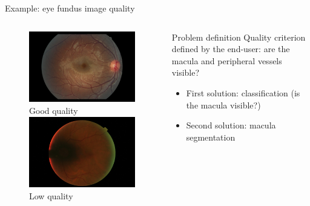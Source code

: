 \documentclass[xcolor=pdftex,dvipsnames,table,mathserif]{beamer}
\begin{document}
\begin{frame}{Example: eye fundus image quality}

\begin{columns}
  \begin{column}{.4\textwidth}
    \begin{figure}[ht]
      \centering
      \includegraphics[width=\textwidth]{fundus1}\\
      Good quality\vspace{1em}\\
      \includegraphics[width=\textwidth]{fundus2}\\
      Low quality
    \end{figure}

  \end{column}

  \begin{column}{.6\textwidth}
    \begin{block}{Problem definition}
    Quality criterion defined by the end-user: are the macula and peripheral vessels visible?
    \end{block}
    \pause
    \begin{itemize}
    \item First solution: classification (is the macula visible?)
    \item Second solution: macula segmentation
      \end{itemize}
  \end{column}
\end{columns}


\end{frame}
\end{document}
